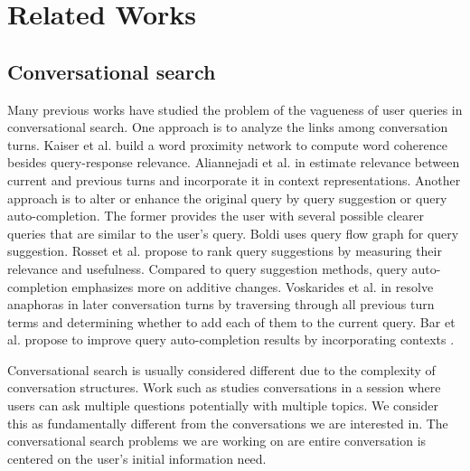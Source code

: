 \documentclass[format=acmsmall, review=False, screen=true]{acmart}
\begin{document}
\section{Related Works}
\subsection{\textbf{Conversational search}}
Many previous works have studied the problem of the vagueness of user queries in conversational search. One approach is to analyze the links among conversation turns. Kaiser et al. \cite{wordproximitynetwork} build a word proximity network to compute word coherence besides query-response relevance. Aliannejadi et al. in \cite{relevantturn} estimate relevance between current and previous turns and incorporate it in context representations. Another approach is to alter or enhance the original query by query suggestion or query auto-completion. The former provides the user with several possible clearer queries that are similar to the user's query. Boldi \cite{boldi2008, boldi2009} uses query flow graph for query suggestion. Rosset et al. \cite{rosset2020leading} propose to rank query suggestions by measuring their relevance and usefulness. Compared to query suggestion methods, query auto-completion emphasizes more on additive changes. Voskarides et al. in \cite{queryresolution} resolve anaphoras in later conversation turns by traversing through all previous turn terms and determining whether to add each of them to the current query. Bar et al. propose to improve query auto-completion results by incorporating contexts \cite{querycompletionwithcontext}.

Conversational search is usually considered different due to the complexity of conversation structures. Work such as \cite{yangnextquestion, topicpropagation, qu2020open} studies conversations in a session where users can ask multiple questions potentially with multiple topics. We consider this as fundamentally different from the conversations we are interested in. The conversational search problems we are working on are entire conversation is centered on the user's initial information need. 
\end{document}
